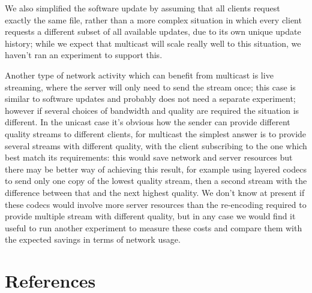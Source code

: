 \documentclass[a4paper,12pt]{article}
\newcommand{\TODO}[1]{\par\noindent%
\hspace*{\fill}%
\framebox{\parbox{0.9\linewidth}{{\bf TODO: }#1}}%
\hspace*{\fill}%
}
\begin{document}
We also simplified the software update by assuming that all clients
request exactly the same file, rather than a more complex situation
in which every client requests a different subset of all available
updates, due to its own unique update history; while we expect that
multicast will scale really well to this situation, we haven't
ran an experiment to support this.

Another type of network activity which can benefit from multicast is
live streaming, where the server will only need to send the stream once;
this case is similar to software updates and probably does not need a
separate experiment; however if several choices of bandwidth and quality
are required the situation is different.  In the unicast case it's obvious
how the sender can provide different quality streams to different clients,
for multicast the simplest answer is to provide several streams with
different quality, with the client subscribing to the one which best
match its requirements: this would save network and server resources
but there may be better way of achieving this result, for example using
layered codecs to send only one copy of the lowest quality stream, then
a second stream with the difference between that and the next highest
quality. We don't know at present if these codecs would involve more
server resources than the re-encoding required to provide multiple
stream with different quality, but in any case we would find it useful
to run another experiment to measure these costs and compare them with
the expected savings in terms of network usage.

\section*{References}
\TODO{No work is an island}
\end{document}
